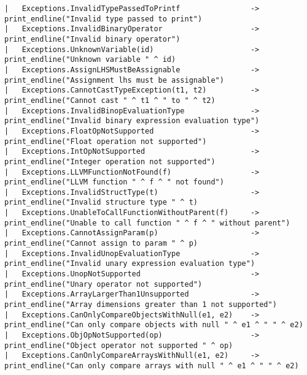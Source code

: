 \begin{verbatim}
| 	Exceptions.InvalidTypePassedToPrintf				-> print_endline("Invalid type passed to print")
| 	Exceptions.InvalidBinaryOperator					-> print_endline("Invalid binary operator")
| 	Exceptions.UnknownVariable(id) 						-> print_endline("Unknown variable " ^ id)
| 	Exceptions.AssignLHSMustBeAssignable 				-> print_endline("Assignment lhs must be assignable")
| 	Exceptions.CannotCastTypeException(t1, t2) 			-> print_endline("Cannot cast " ^ t1 ^ " to " ^ t2)
| 	Exceptions.InvalidBinopEvaluationType 				-> print_endline("Invalid binary expression evaluation type")
| 	Exceptions.FloatOpNotSupported 						-> print_endline("Float operation not supported")
| 	Exceptions.IntOpNotSupported 						-> print_endline("Integer operation not supported")
| 	Exceptions.LLVMFunctionNotFound(f)  				-> print_endline("LLVM function " ^ f ^ " not found")
| 	Exceptions.InvalidStructType(t) 					-> print_endline("Invalid structure type " ^ t)
| 	Exceptions.UnableToCallFunctionWithoutParent(f) 	-> print_endline("Unable to call function " ^ f ^ " without parent")
| 	Exceptions.CannotAssignParam(p) 					-> print_endline("Cannot assign to param " ^ p)
| 	Exceptions.InvalidUnopEvaluationType 				-> print_endline("Invalid unary expression evaluation type")
| 	Exceptions.UnopNotSupported 						-> print_endline("Unary operator not supported")
| 	Exceptions.ArrayLargerThan1Unsupported 				-> print_endline("Array dimensions greater than 1 not supported")
| 	Exceptions.CanOnlyCompareObjectsWithNull(e1, e2) 	-> print_endline("Can only compare objects with null " ^ e1 ^ " " ^ e2)
| 	Exceptions.ObjOpNotSupported(op) 					-> print_endline("Object operator not supported " ^ op)
| 	Exceptions.CanOnlyCompareArraysWithNull(e1, e2) 	-> print_endline("Can only compare arrays with null " ^ e1 ^ " " ^ e2)
\end{verbatim}	